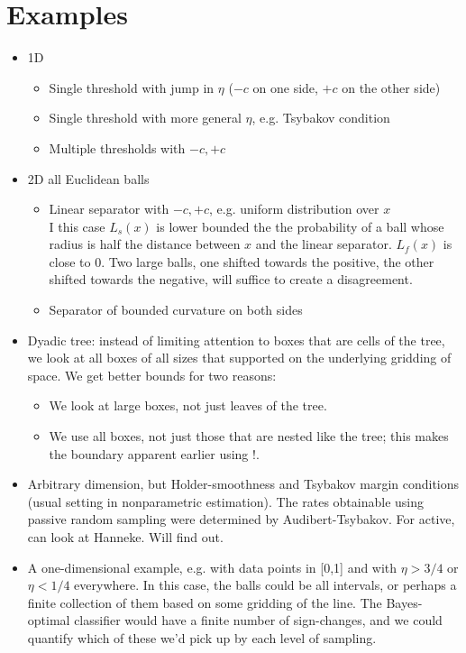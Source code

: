 \documentclass{article}
\begin{document}
\section{Examples}
\begin{itemize}
    \item 1D
    \begin{itemize}
        \item Single threshold with jump in $\eta$ ($-c$ on one side, $+c$ on the other side)
        \item Single threshold with more general $\eta$, e.g. Tsybakov condition
        \item Multiple thresholds with $-c, +c$
    \end{itemize}
    \item 2D all Euclidean balls
    \begin{itemize}
        \item Linear separator with $-c, +c$, e.g. uniform distribution over $x$\\
        I this case $L_s(x)$ is lower bounded the the probability of a
        ball whose radius is half the distance between $x$ and the
        linear separator. $L_f(x)$ is close to 0. Two large balls, one
        shifted towards the positive, the other shifted towards the
        negative, will suffice to create a disagreement.

        \item Separator of bounded curvature on both sides
    \end{itemize}
    \item Dyadic tree: instead of limiting attention to boxes that are cells of the tree, we look at all boxes of all sizes that supported on the underlying gridding of space. We get better bounds for two reasons:
    \begin{itemize}
        \item We look at large boxes, not just leaves of the tree.
        \item We use all boxes, not just those that are nested like the tree; this makes the boundary apparent earlier using !.
    \end{itemize}
    \item Arbitrary dimension, but Holder-smoothness and Tsybakov margin conditions (usual setting in nonparametric estimation). The rates obtainable using passive random sampling were determined by Audibert-Tsybakov. For active, can look at Hanneke. Will find out.
    \item A one-dimensional example, e.g. with data points in [0,1] and with
$\eta > 3/4$ or $\eta < 1/4$ everywhere. In this case, the balls could
be all intervals, or perhaps a finite collection of them based on some
gridding of the line. The Bayes-optimal classifier would have a finite
number of sign-changes, and we could quantify which of these we'd pick
up by each level of sampling.


\end{itemize}
\end{document}
